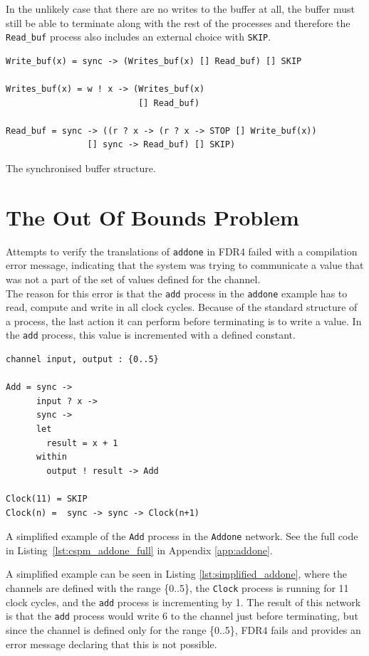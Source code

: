 In the unlikely case that there are no writes to the buffer at all, the buffer must still be able to terminate along with the rest of the processes and therefore the \texttt{Read\_buf} process also includes an external choice with \texttt{SKIP}.

\begin{listing}
\begin{verbatim}
Write_buf(x) = sync -> (Writes_buf(x) [] Read_buf) [] SKIP

Writes_buf(x) = w ! x -> (Writes_buf(x)
                          [] Read_buf)

Read_buf = sync -> ((r ? x -> (r ? x -> STOP [] Write_buf(x))
                [] sync -> Read_buf) [] SKIP)
\end{verbatim}
\caption{The synchronised buffer structure.}
\label{lst:buffer}
\end{listing}

\section{The Out Of Bounds Problem}
Attempts to verify the \cspm{} translations of \texttt{addone} in FDR4 failed with a compilation error message, indicating that the system was trying to communicate a value that was not a part of the set of values defined for the channel. \\

The reason for this error is that the \texttt{add} process in the \texttt{addone} example has to read, compute and write in all clock cycles. Because of the standard structure of a process, the last action it can perform before terminating is to write a value. In the \texttt{add} process, this value is incremented with a defined constant.\\

\begin{listing}
\begin{verbatim}
channel input, output : {0..5}

Add = sync ->
      input ? x ->
      sync ->
      let
        result = x + 1
      within
        output ! result -> Add

Clock(11) = SKIP
Clock(n) =  sync -> sync -> Clock(n+1)
\end{verbatim}
\caption{A simplified example of the \texttt{Add} process in the \texttt{Addone} network. See the full code in Listing~\ref{lst:cspm_addone_full} in Appendix \ref{app:addone}.}
\label{lst:simplified_addone}
\end{listing}
A simplified example can be seen in Listing \ref{lst:simplified_addone}, where the channels are defined with the range \{0..5\}, the \texttt{Clock} process is running for 11 clock cycles, and the \texttt{add} process is incrementing by 1.
The result of this network is that the \texttt{add} process would write 6 to the channel just before terminating, but since the channel is defined only for the range \{0..5\}, FDR4 fails and provides an error message declaring that this is not possible.\\

